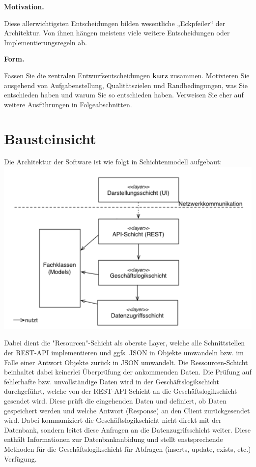 \documentclass[]{article}
\begin{document}
\textbf{Motivation.}

Diese allerwichtigsten Entscheidungen bilden wesentliche „Eckpfeiler``
der Architektur. Von ihnen hängen meistens viele weitere Entscheidungen
oder Implementierungsregeln ab.

\textbf{Form.}

Fassen Sie die zentralen Entwurfsentscheidungen \textbf{kurz} zusammen.
Motivieren Sie ausgehend von Aufgabenstellung, Qualitätszielen und
Randbedingungen, was Sie entschieden haben und warum Sie so entschieden
haben. Verweisen Sie eher auf weitere Ausführungen in Folgeabschnitten.

\section{Bausteinsicht}\label{section-building-block-view}
Die Architektur der Software ist wie folgt in Schichtenmodell aufgebaut:
\includegraphics{images/SoftwareLayers.png}

Dabei dient die "Resourcen"-Schicht als oberste Layer, welche alle Schnittstellen der REST-API implementieren und ggfs. JSON in Objekte umwandeln bzw. im Falle einer Antwort Objekte zurück in JSON umwandelt. Die Ressourcen-Schicht beinhaltet dabei keinerlei Überprüfung der ankommenden Daten. Die Prüfung auf fehlerhafte bzw. unvollständige Daten wird in der Geschäftslogikschicht durchgeführt, welche von der REST-API-Schicht an die Geschäftslogikschicht gesendet wird. Diese prüft die eingehenden Daten und definiert, ob Daten gespeichert werden und welche Antwort (Response) an den Client zurückgesendet wird. Dabei kommuniziert die Geschäftslogikschicht nicht direkt mit der Datenbank, sondern leitet diese Anfragen an die Datenzugrifsschicht weiter. Diese enthält Informationen zur Datenbankanbidung und stellt enstsprechende Methoden für die Geschäftslogikschicht für Abfragen (inserts, update, exists, etc.) Verfügung.
\end{document}

